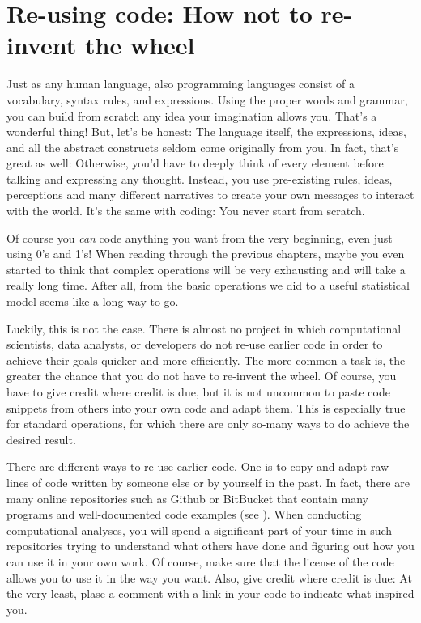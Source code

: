 \section{Re-using code: How not to re-invent the wheel}
\label{sec:code}

Just as any human language, also programming languages consist of a vocabulary, syntax rules, and expressions. Using the proper words and grammar, you can build from scratch any idea your imagination allows you. That's a wonderful thing! But, let's be honest: The language itself, the expressions, ideas, and all the abstract constructs seldom come originally from you. In fact, that's great as well: Otherwise, you'd have to deeply think of every element before talking and expressing any thought. Instead, you use pre-existing rules, ideas, perceptions and many different narratives to create your own messages to interact with the world. It's the same with coding: You never start from scratch.

Of course you \emph{can} code anything you want from the very beginning, even just using 0's and 1's!
When reading through the previous chapters, maybe you even started to think that complex operations will be very exhausting and will take a really long time. After all, from the basic operations we did to a useful statistical model seems like a long way to go.

Luckily, this is not the case.
There is almost no project in which computational scientists, data analysts, or developers do not re-use earlier code in order to achieve their goals quicker and more efficiently.
The more common a task is, the greater the chance that you do not have to re-invent the wheel.
Of course, you have to give credit where credit is due, but it is not uncommon to paste code snippets from others into your own code and adapt them. This is especially true for standard operations, for which there are only so-many ways to do achieve the desired result.

There are different ways to re-use earlier code. One is to copy and adapt raw lines of code written by someone else or by yourself in the past. In fact, there are many online repositories such as Github or BitBucket that contain many programs and well-documented code examples (see ). When conducting computational analyses, you will spend a significant part of your time in such repositories trying to understand what others have done and figuring out how you can use it in your own work. Of course, make sure that the license of the code allows you to use it in the way you want. Also, give credit where credit is due: At the very least, plase a comment with a link in your code to indicate what inspired you.

